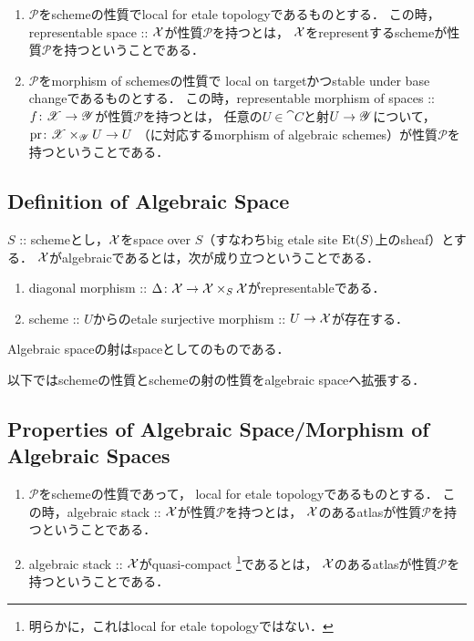 \documentclass[a4paper, dvipdfmx]{jsarticle}
\newcommand{\Diag}{\Delta}
\begin{document}
    \begin{Def}
        \enumfix
    \begin{enumerate}
    \item
        $\mathcal{P}$をschemeの性質でlocal for etale topologyであるものとする．
        この時，representable space :: $\mathcal{X}$が性質$\mathcal{P}$を持つとは，
        $\mathcal{X}$をrepresentするschemeが性質$\mathcal{P}$を持つということである．

    \item
        $\mathcal{P}$をmorphism of schemesの性質で
        local on targetかつstable under base changeであるものとする．
        この時，representable morphism of spaces :: $f \colon \mathscr{X} \to \mathscr{Y}$が性質$\mathcal{P}$を持つとは，
        任意の$U \in \cat{C}$と射$U \to \mathscr{Y}$について，
        $\operatorname{pr} \colon \mathscr{X} \times_{\mathscr{Y}} U \to U$
        （に対応するmorphism of algebraic schemes）が性質$\mathcal{P}$を持つということである．
    \end{enumerate}
    \end{Def}

\subsection{Definition of Algebraic Space}
    \begin{Def}
        $S$ :: schemeとし，$\mathcal{X}$をspace over $S$（すなわちbig etale site $\mathrm{Et}(S)$上のsheaf）とする．
        $\mathcal{X}$がalgebraicであるとは，次が成り立つということである．
    \begin{enumerate}
        \item diagonal morphism :: $\Diag \colon \shX \to \shX \times_{S} \shX$がrepresentableである．
        \item scheme :: $U$からのetale surjective morphism :: $U \to \mathcal{X}$が存在する．
    \end{enumerate}
        Algebraic spaceの射はspaceとしてのものである．
    \end{Def}
    
以下ではschemeの性質とschemeの射の性質をalgebraic spaceへ拡張する．

\subsection{Properties of Algebraic Space/Morphism of Algebraic Spaces}
    \begin{Def}
        \enumfix
    \begin{enumerate}
    \item
        $\mathcal{P}$をschemeの性質であって，
        local for etale topologyであるものとする．
        この時，algebraic stack :: $\mathcal{X}$が性質$\mathcal{P}$を持つとは，
        $\mathcal{X}$のあるatlasが性質$\mathcal{P}$を持つということである．

    \item
        algebraic stack :: $\mathcal{X}$がquasi-compact
        \footnote{ 明らかに，これはlocal for etale topologyではない． }であるとは，
        $\mathcal{X}$のあるatlasが性質$\mathcal{P}$を持つということである．
    \end{enumerate}
    \end{Def}
\end{document}
